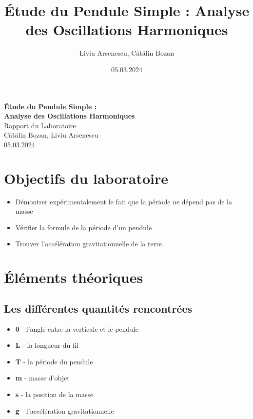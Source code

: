 \documentclass[12pt,a4paper]{article}
\title{Étude du Pendule Simple : Analyse des Oscillations Harmoniques}
\author{Liviu Arsenescu, Cătălin Bozan}
\date{05.03.2024}
\begin{document}
    \begin{titlepage}
        \begin{center}
            \vspace*{\fill}
            \Huge \textbf{Étude du Pendule Simple :} \\
            \Huge \textbf{Analyse des Oscillations Harmoniques} \\
            \Large Rapport du Laboratoire \\
            \vspace{\fill}
            \Large Cătălin Bozan, Liviu Arsenescu \\
            05.03.2024

            \vspace*{\fill}
        \end{center}
    \end{titlepage}

    \tableofcontents

    \newpage

    \section{Objectifs du laboratoire}
    \begin{itemize}
        \item Démontrer expérimentalement le fait que la période ne dépend pas de la masse
        \item Vérifier la formule de la période d'un pendule
        \item Trouver l'accélération gravitationnelle de la terre
    \end{itemize}

    \section{Éléments théoriques}
    \subsection{Les différentes quantités rencontrées}
    \begin{itemize}
        \item $\bm{\theta}$ - l'angle entre la verticale et le pendule
        \item \textbf{L} - la longueur du fil
        \item \textbf{T} - la période du pendule
        \item \textbf{m} - masse d'objet
        \item \textbf{s} - la position de la masse
        \item \textbf{g} - l'accélération gravitationnelle
    \end{itemize}
\end{document}
